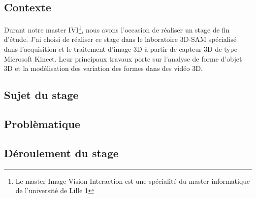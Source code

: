 \subsection{Contexte}
Durant notre master IVI\footnote{Le master Image Vision Interaction est 
une spécialité du master informatique de l'université de Lille 1}, 
nous avons l'occasion de réaliser un stage de fin d'étude. J'ai choisi de réaliser ce stage
dans le laboratoire 3D-SAM spécialisé dans l'acquisition et le traitement d'image 3D 
à partir de capteur 3D de type Microsoft Kinect. Leur principaux travaux porte sur
l'analyse de forme d'objet 3D et la modélisation des variation des formes dans des
vidéo 3D. 

\subsection{Sujet du stage}

\subsection{Problèmatique}

\subsection{Déroulement du stage}
